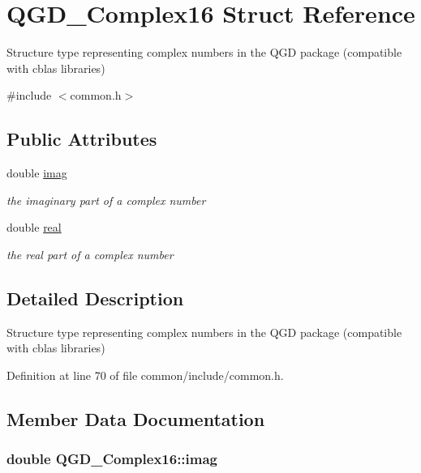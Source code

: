 \hypertarget{struct_q_g_d___complex16}{}\section{Q\+G\+D\+\_\+\+Complex16 Struct Reference}
\label{struct_q_g_d___complex16}


Structure type representing complex numbers in the Q\+GD package (compatible with cblas libraries)  




{\ttfamily \#include $<$common.\+h$>$}

\subsection*{Public Attributes}
\begin{DoxyCompactItemize}
\item 
double \hyperlink{struct_q_g_d___complex16_a189304d34eb9dc54e19de7eeb0b71370}{imag}
\begin{DoxyCompactList}\small\item\em the imaginary part of a complex number \end{DoxyCompactList}\item 
double \hyperlink{struct_q_g_d___complex16_aea2798213f363d5b681562b889ff7260}{real}
\begin{DoxyCompactList}\small\item\em the real part of a complex number \end{DoxyCompactList}\end{DoxyCompactItemize}


\subsection{Detailed Description}
Structure type representing complex numbers in the Q\+GD package (compatible with cblas libraries) 

Definition at line 70 of file common/include/common.\+h.



\subsection{Member Data Documentation}
\subsubsection[{\texorpdfstring{imag}{imag}}]{\setlength{\rightskip}{0pt plus 5cm}double Q\+G\+D\+\_\+\+Complex16\+::imag}\hypertarget{struct_q_g_d___complex16_a189304d34eb9dc54e19de7eeb0b71370}{}\label{struct_q_g_d___complex16_a189304d34eb9dc54e19de7eeb0b71370}


